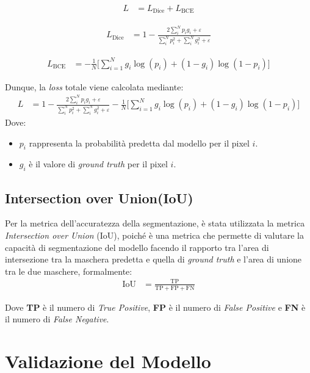 \begin{align}
	L & = L_{\text{Dice}} + L_{\text{BCE}}
	\label{eq:dice_bce_loss}
\end{align}

\begin{align}
	L_{\text{Dice}} & = 1 - \frac{2\sum_i^N p_i g_i + \varepsilon}{\sum_i^N p_i^2 + \sum_i^N g_i^2 + \varepsilon}
	\label{eq:dice_loss}
\end{align}

\begin{align}
	L_{\text{BCE}} & = -\frac{1}{N} \Bigg[ \sum_{i=1}^N g_i \log(p_i) + (1 - g_i) \log(1 - p_i) \Bigg]
	\label{eq:bce_loss}
\end{align}

Dunque, la \textit{loss} totale viene calcolata mediante:
\begin{align}
	L & = 1 - \frac{2\sum_i^N p_i g_i + \varepsilon}{\sum_i^N p_i^2 + \sum_i^N g_i^2 + \varepsilon} -\frac{1}{N} \Bigg[ \sum_{i=1}^N g_i \log(p_i) + (1 - g_i) \log(1 - p_i) \Bigg]
	\label{eq:dice_bce_loss_complete}
\end{align}
Dove:
\begin{itemize}
	\item $p_i$ rappresenta la probabilità predetta dal modello per il pixel $i$.
	\item $g_i$ è il valore di \textit{ground truth} per il pixel $i$.
\end{itemize}

\subsection{Intersection over Union(IoU)}
Per la metrica dell'accuratezza della segmentazione, è stata utilizzata la metrica \textit{Intersection over Union} (IoU),
poiché è una metrica che permette di valutare la capacità di segmentazione del modello
facendo il rapporto tra l'area di intersezione tra la maschera predetta e quella di \textit{ground truth} e l'area di unione tra le due maschere, formalmente:
\begin{align}
	\text{IoU} & = \frac{\text{TP}}{\text{TP} + \text{FP} + \text{FN}}
	\label{eq:iou}
\end{align}

Dove \textbf{TP} è il numero di \textit{True Positive}, \textbf{FP} è il numero
di \textit{False Positive} e \textbf{FN} è il numero di \textit{False
	Negative}.

\section{Validazione del Modello}
\label{sec:model_validation}

